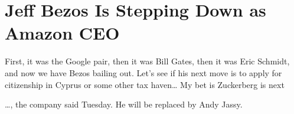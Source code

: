 \chapter{Jeff Bezos Is Stepping Down as Amazon CEO}

\begin{refsection}

First, it was the Google pair, then it was Bill Gates, then it was Eric Schmidt, and now we have Bezos bailing out. Let's see if his next move is to apply for citizenship in Cyprus or some other tax haven\dots{} My bet is Zuckerberg is next 

\begin{tcolorbox}[quote]

\dots{}, the company said Tuesday. He will be replaced by Andy Jassy.\textsubscript{\cite{url98123b9d}}

\end{tcolorbox}

\printbibliography[heading=subbibliography]

\end{refsection}